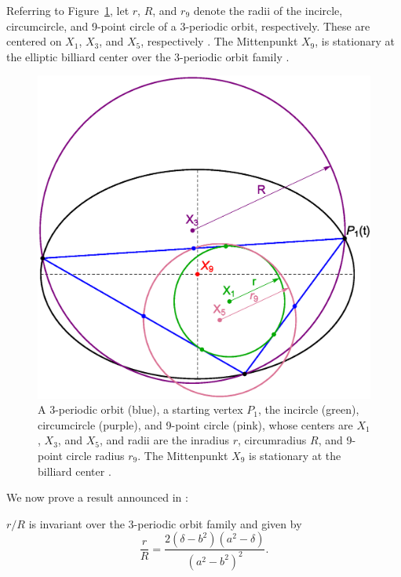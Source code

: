 Referring to  Figure~\ref{fig:radii}, let $r$, $R$, and $r_9$ denote the radii of the incircle, circumcircle, and 9-point circle of a 3-periodic orbit, respectively. These are centered on $X_1$, $X_3$, and $X_5$, respectively \cite{coxeter67}. The Mittenpunkt $X_9$, is stationary at the elliptic billiard center over the 3-periodic orbit family \cite{reznik2019-intelligencer}.

\begin{figure}[H]
    \centering
    \includegraphics[width=.75\textwidth]{1040_Radii.eps}
    \caption{A 3-periodic orbit (blue), a starting vertex $P_1$, the incircle (green), circumcircle (purple), and 9-point circle (pink), whose centers are $X_1$, $X_3$, and $X_5$, and radii are the inradius $r$, circumradius $R$, and 9-point circle radius $r_9$. The Mittenpunkt $X_9$ is stationary at the billiard center \cite{reznik2019-intelligencer}.}
    \label{fig:radii}
\end{figure}

\noindent We now prove a result announced in  \cite{reznik2019-intelligencer}:

\begin{theorem}
\label{thm:rovR}
$r/R$ is invariant over the 3-periodic orbit family and given by
\begin{equation}
\label{eqn:rovR}
\frac{r}{R}=\frac{2 (\delta-b^2)(a^2-\delta)}{(a^2-b^2)^2}.
\end{equation}
\end{theorem}

